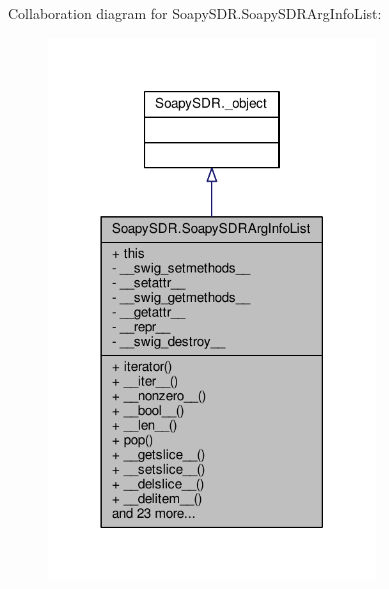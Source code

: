 Collaboration diagram for Soapy\+S\+D\+R.\+Soapy\+S\+D\+R\+Arg\+Info\+List\+:
\nopagebreak
\begin{figure}[H]
\begin{center}
\leavevmode
\includegraphics[width=246pt]{db/d9b/classSoapySDR_1_1SoapySDRArgInfoList__coll__graph}
\end{center}
\end{figure}
